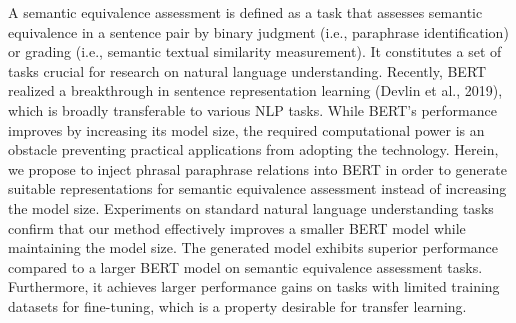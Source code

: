 A semantic equivalence assessment is defined as a task that assesses semantic equivalence in a sentence pair by binary judgment (i.e., paraphrase identification) or grading (i.e., semantic textual similarity measurement). 
It constitutes a set of tasks crucial for research on natural language understanding. 
Recently, BERT realized a breakthrough in sentence representation learning (Devlin et al., 2019), which is broadly transferable to various NLP tasks. 
While BERT's performance improves by increasing its model size, the required computational power is an obstacle preventing practical applications from adopting the technology. 
Herein, we propose to inject phrasal paraphrase relations into BERT in order to generate suitable representations for semantic equivalence assessment instead of increasing the model size. 
Experiments on standard natural language understanding tasks confirm that our method effectively improves a smaller BERT model while maintaining the model size. 
The generated model exhibits superior performance compared to a larger BERT model on semantic equivalence assessment tasks. 
Furthermore, it achieves larger performance gains on tasks with limited training datasets for fine-tuning, which is a property desirable for transfer learning.